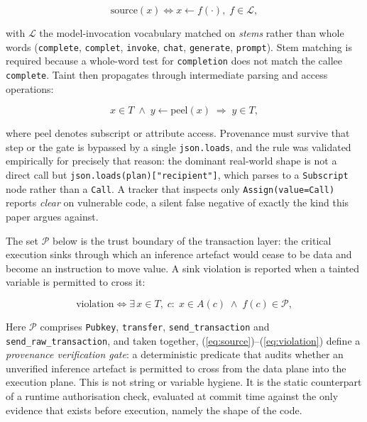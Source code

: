 \begin{equation}
\mathrm{source}(x) \iff x \leftarrow f(\cdot), \;
f \in \mathcal{L},
\label{eq:source}
\end{equation}

with $\mathcal{L}$ the model-invocation vocabulary matched on \emph{stems}
rather than whole words (\texttt{complete}, \texttt{complet},
\texttt{invoke}, \texttt{chat}, \texttt{generate}, \texttt{prompt}). Stem
matching is required because a whole-word test for \texttt{completion} does not
match the callee \texttt{complete}. Taint then propagates through intermediate
parsing and access operations:

\begin{equation}
x \in T \;\wedge\; y \leftarrow \mathrm{peel}(x) \;\Rightarrow\; y \in T,
\label{eq:taint}
\end{equation}

where $\mathrm{peel}$ denotes subscript or attribute access. Provenance must
survive that step or the gate is bypassed by a single \texttt{json.loads}, and
the rule was validated empirically for precisely that reason: the dominant
real-world shape is not a direct call but
\texttt{json.loads(plan)["recipient"]}, which parses to a \texttt{Subscript}
node rather than a \texttt{Call}. A tracker that inspects only
\texttt{Assign(value=Call)} reports \emph{clear} on vulnerable code, a silent
false negative of exactly the kind this paper argues against.

The set $\mathcal{P}$ below is the trust boundary of the transaction layer: the
critical execution sinks through which an inference artefact would cease to be
data and become an instruction to move value. A sink violation is reported when
a tainted variable is permitted to cross it:

\begin{equation}
\mathrm{violation} \iff \exists\, x \in T,\; c:\;
x \in A(c) \;\wedge\; f(c) \in \mathcal{P},
\label{eq:violation}
\end{equation}

Here $\mathcal{P}$ comprises \texttt{Pubkey}, \texttt{transfer},
\texttt{send\_transaction} and \texttt{send\_\allowbreak raw\_\allowbreak transaction},
and taken together, (\ref{eq:source})--(\ref{eq:violation}) define a
\emph{provenance verification gate}: a deterministic predicate that audits
whether an unverified inference artefact is permitted to cross from the data
plane into the execution plane. This is not string or variable hygiene. It is
the static counterpart of a runtime authorisation check, evaluated at commit
time against the only evidence that exists before execution, namely the shape
of the code.

